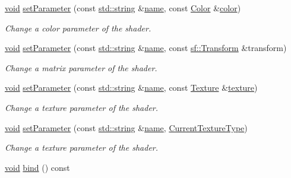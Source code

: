 \begin{DoxyCompactItemize}
\hyperlink{glutf90_8h_ac778d6f63f1aaf8ebda0ce6ac821b56e}{void} \hyperlink{classsf_1_1_shader_aa8618119ed4399df3fd33e78ee96b4fc}{set\-Parameter} (const \hyperlink{gl3_8h_ac83513893df92266f79a515488701770}{std\-::string} \&\hyperlink{gl3_8h_aaced7cfc21e7d37775d6921bb8177239}{name}, const \hyperlink{classsf_1_1_color}{Color} \&\hyperlink{gl3_8h_a3ea846f998d64f079b86052b6c4193a8}{color})
\begin{DoxyCompactList}\small\item\em Change a color parameter of the shader. \end{DoxyCompactList}\item 
\hyperlink{glutf90_8h_ac778d6f63f1aaf8ebda0ce6ac821b56e}{void} \hyperlink{classsf_1_1_shader_a39c387cc30e249b22a0c478703b8cc9a}{set\-Parameter} (const \hyperlink{gl3_8h_ac83513893df92266f79a515488701770}{std\-::string} \&\hyperlink{gl3_8h_aaced7cfc21e7d37775d6921bb8177239}{name}, const \hyperlink{classsf_1_1_transform}{sf\-::\-Transform} \&transform)
\begin{DoxyCompactList}\small\item\em Change a matrix parameter of the shader. \end{DoxyCompactList}\item 
\hyperlink{glutf90_8h_ac778d6f63f1aaf8ebda0ce6ac821b56e}{void} \hyperlink{classsf_1_1_shader_a7f58ab5c0a1084f238dfcec86602daa1}{set\-Parameter} (const \hyperlink{gl3_8h_ac83513893df92266f79a515488701770}{std\-::string} \&\hyperlink{gl3_8h_aaced7cfc21e7d37775d6921bb8177239}{name}, const \hyperlink{classsf_1_1_texture}{Texture} \&\hyperlink{gl3_8h_ab21590c4736d1459a5a0674a42b5a655}{texture})
\begin{DoxyCompactList}\small\item\em Change a texture parameter of the shader. \end{DoxyCompactList}\item 
\hyperlink{glutf90_8h_ac778d6f63f1aaf8ebda0ce6ac821b56e}{void} \hyperlink{classsf_1_1_shader_af06b4cba0bab915fa01032b063909044}{set\-Parameter} (const \hyperlink{gl3_8h_ac83513893df92266f79a515488701770}{std\-::string} \&\hyperlink{gl3_8h_aaced7cfc21e7d37775d6921bb8177239}{name}, \hyperlink{structsf_1_1_shader_1_1_current_texture_type}{Current\-Texture\-Type})
\begin{DoxyCompactList}\small\item\em Change a texture parameter of the shader. \end{DoxyCompactList}\item 
\hyperlink{glutf90_8h_ac778d6f63f1aaf8ebda0ce6ac821b56e}{void} \hyperlink{classsf_1_1_shader_ab170f43610b4fcc7c69a55575650fb95}{bind} () const 

\end{DoxyCompactItemize}
